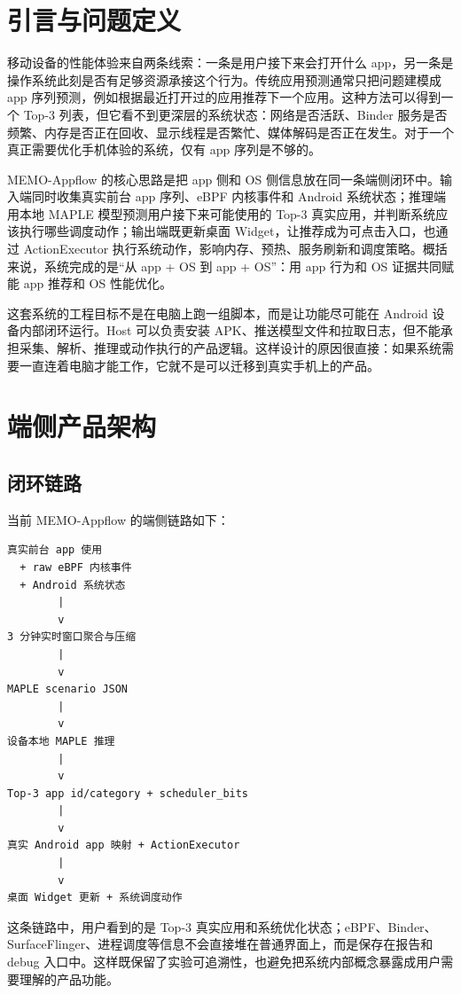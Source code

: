 \section{引言与问题定义}

移动设备的性能体验来自两条线索：一条是用户接下来会打开什么 app，另一条是操作系统此刻是否有足够资源承接这个行为。传统应用预测通常只把问题建模成 app 序列预测，例如根据最近打开过的应用推荐下一个应用。这种方法可以得到一个 Top-3 列表，但它看不到更深层的系统状态：网络是否活跃、Binder 服务是否频繁、内存是否正在回收、显示线程是否繁忙、媒体解码是否正在发生。对于一个真正需要优化手机体验的系统，仅有 app 序列是不够的。

MEMO-Appflow 的核心思路是把 app 侧和 OS 侧信息放在同一条端侧闭环中。输入端同时收集真实前台 app 序列、eBPF 内核事件和 Android 系统状态；推理端用本地 MAPLE 模型预测用户接下来可能使用的 Top-3 真实应用，并判断系统应该执行哪些调度动作；输出端既更新桌面 Widget，让推荐成为可点击入口，也通过 ActionExecutor 执行系统动作，影响内存、预热、服务刷新和调度策略。概括来说，系统完成的是“从 app + OS 到 app + OS”：用 app 行为和 OS 证据共同赋能 app 推荐和 OS 性能优化。

这套系统的工程目标不是在电脑上跑一组脚本，而是让功能尽可能在 Android 设备内部闭环运行。Host 可以负责安装 APK、推送模型文件和拉取日志，但不能承担采集、解析、推理或动作执行的产品逻辑。这样设计的原因很直接：如果系统需要一直连着电脑才能工作，它就不是可以迁移到真实手机上的产品。

\section{端侧产品架构}

\subsection{闭环链路}

当前 MEMO-Appflow 的端侧链路如下：

\begin{verbatim}
真实前台 app 使用
  + raw eBPF 内核事件
  + Android 系统状态
        |
        v
3 分钟实时窗口聚合与压缩
        |
        v
MAPLE scenario JSON
        |
        v
设备本地 MAPLE 推理
        |
        v
Top-3 app id/category + scheduler_bits
        |
        v
真实 Android app 映射 + ActionExecutor
        |
        v
桌面 Widget 更新 + 系统调度动作
\end{verbatim}

这条链路中，用户看到的是 Top-3 真实应用和系统优化状态；eBPF、Binder、SurfaceFlinger、进程调度等信息不会直接堆在普通界面上，而是保存在报告和 debug 入口中。这样既保留了实验可追溯性，也避免把系统内部概念暴露成用户需要理解的产品功能。

